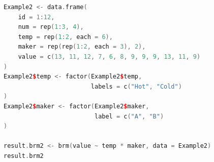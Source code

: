 \begin{lstlisting}[language=c++,label={code:27_06},caption={データを作ってbrmでベイズ推定}]
Example2 <- data.frame(
    id = 1:12,
    num = rep(1:3, 4),
    temp = rep(1:2, each = 6),
    maker = rep(rep(1:2, each = 3), 2),
    value = c(13, 11, 12, 7, 6, 8, 9, 9, 9, 13, 11, 9)
)
Example2$temp <- factor(Example2$temp,
                        labels = c("Hot", "Cold")
)
Example2$maker <- factor(Example2$maker,
                         label = c("A", "B")
)

result.brm2 <- brm(value ~ temp * maker, data = Example2)
result.brm2
\end{lstlisting}
